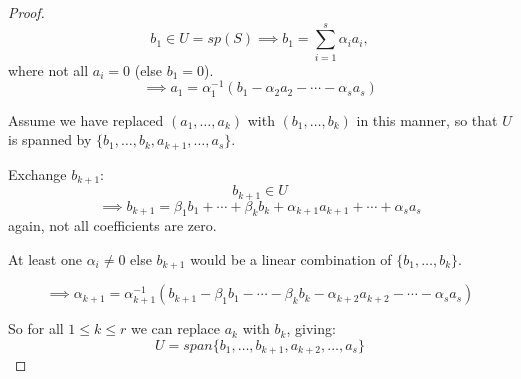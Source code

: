 \documentclass[a4paper,10pt]{article}
\begin{document}
\begin{proof}
	\[
		b_1 \in U = sp(S)
		\implies b_1 = \sum_{i=1}^s \alpha_i a_i,
	\]
	where not all $a_i = 0$ (else $b_1 = 0$).
	\[
		\implies a_1 = \alpha_1^{-1}
		( b_1 - \alpha_2 a_2 - \cdots - \alpha_s a_s )
	\]

	Assume we have replaced $(a_1, \ldots, a_k)$ with
	$(b_1, \ldots, b_k)$ in this manner, so that
	$U$ is spanned by $\{ b_1, \ldots, b_k, a_{k+1}, \ldots, a_s \}$.

	Exchange $b_{k+1}$:
	\[ b_{k+1} \in U \]
	\[
		\implies b_{k+1} =
		\beta_1 b_1 + \cdots + \beta_k b_k
		+ \alpha_{k+1} a_{k+1} + \cdots + \alpha_s a_s
	\]
	again, not all coefficients are zero.

	At least one $\alpha_i \neq 0$ else $b_{k+1}$ would be a linear
	combination of $\{ b_1, \ldots, b_k \}$.

	\[
		\implies \alpha_{k+1} = \alpha_{k+1}^{-1}
		(
			b_{k+1} - \beta_1 b_1 - \cdots - \beta_k b_k
			- \alpha_{k+2} a_{k+2} - \cdots - \alpha_s a_s
		)
	\]

	So for all $1 \leq k \leq r$ we can replace $a_k$ with $b_k$, giving:
	\[
		U = span \{ b_1, \ldots, b_{k+1}, a_{k+2}, \ldots, a_s \}
	\]
\end{proof}
\end{document}
